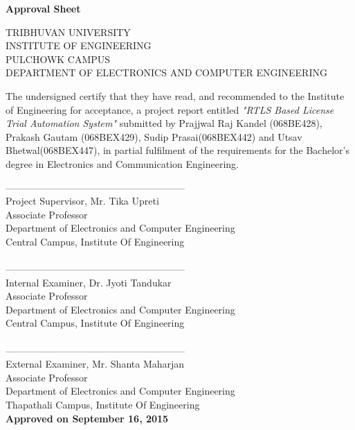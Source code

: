 
\begin{center}
	\begin{Large}
		\textbf{Approval Sheet}\\[1cm]
	\end{Large}
	\vfill
	TRIBHUVAN UNIVERSITY\\
	INSTITUTE OF ENGINEERING\\
	PULCHOWK CAMPUS\\
	DEPARTMENT OF ELECTRONICS AND COMPUTER ENGINEERING\\
\end{center}
The undersigned certify that they have read, and recommended to the Institute of Engineering for acceptance, a project report entitled \emph{"RTLS Based License Trial Automation System"}  submitted by Prajjwal Raj Kandel (068BE428), Prakash Gautam (068BEX429), Sudip Prasai(068BEX442) and Utsav Bhetwal(068BEX447), in partial fulfilment of the requirements for the Bachelor’s degree in Electronics and Communication Engineering.

--------------------------------------------------------\\
Project Supervisor, 
Mr. Tika Upreti\\
Associate Professor \\
Department of Electronics 
and Computer Engineering \\
Central Campus,
Institute Of Engineering \\
\\
--------------------------------------------------------\\
Internal Examiner, 
Dr. Jyoti Tandukar \\
Associate Professor \\
Department of Electronics 
and Computer Engineering \\
Central Campus,
Institute Of Engineering \\
\\
--------------------------------------------------------\\
External Examiner, 
Mr. Shanta Maharjan \\
Associate Professor\\
Department of Electronics 
and Computer Engineering \\
Thapathali Campus,
Institute Of Engineering \\
\textbf{Approved on September 16, 2015}
